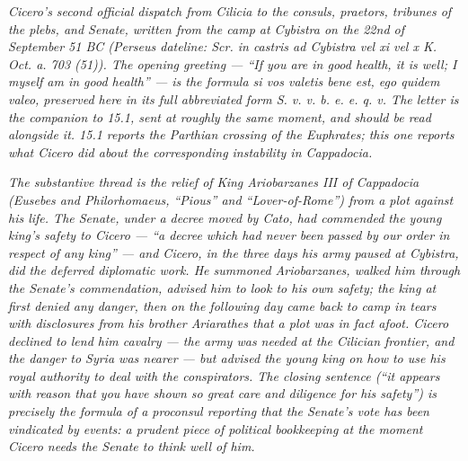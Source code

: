 
\textit{Cicero's second official dispatch from Cilicia
to the consuls, praetors, tribunes of the plebs, and
Senate, written from the camp at Cybistra on the 22nd
of September 51 BC (Perseus dateline: \textit{Scr. in
castris ad Cybistra vel xi vel x K. Oct. a. 703 (51)}).
The opening greeting --- ``If you are in good health,
it is well; I myself am in good health'' --- is the
formula \textit{si vos valetis bene est, ego quidem
valeo}, preserved here in its full abbreviated form
\textit{S. v. v. b. e. e. q. v.} The letter is the
companion to 15.1, sent at roughly the same moment, and
should be read alongside it. 15.1 reports the Parthian
crossing of the Euphrates; this one reports what Cicero
did about the corresponding instability in Cappadocia.}

\textit{The substantive thread is the relief of King
Ariobarzanes III of Cappadocia (Eusebes and
Philorhomaeus, ``Pious'' and ``Lover-of-Rome'') from a
plot against his life. The Senate, under a decree
moved by Cato, had commended the young king's safety to
Cicero --- ``a decree which had never been passed by
our order in respect of any king'' --- and Cicero, in
the three days his army paused at Cybistra, did the
deferred diplomatic work. He summoned Ariobarzanes,
walked him through the Senate's commendation, advised
him to look to his own safety; the king at first denied
any danger, then on the following day came back to
camp in tears with disclosures from his brother
Ariarathes that a plot was in fact afoot. Cicero
declined to lend him cavalry --- the army was needed at
the Cilician frontier, and the danger to Syria was
nearer --- but advised the young king on how to use his
royal authority to deal with the conspirators. The
closing sentence (``it appears with reason that you
have shown so great care and diligence for his safety'')
is precisely the formula of a proconsul reporting that
the Senate's vote has been vindicated by events: a
prudent piece of political bookkeeping at the moment
Cicero needs the Senate to think well of him.}
